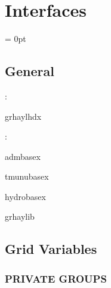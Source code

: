 
\section{Interfaces} 


\parskip = 0pt

\vspace{3mm} \subsection*{General}

: 

grhaylhdx
\vspace{2mm}

: 

admbasex

tmunubasex

hydrobasex

grhaylib
\vspace{2mm}
\subsection*{Grid Variables}
\vspace{5mm}\subsubsection{PRIVATE GROUPS}

\vspace{5mm}

